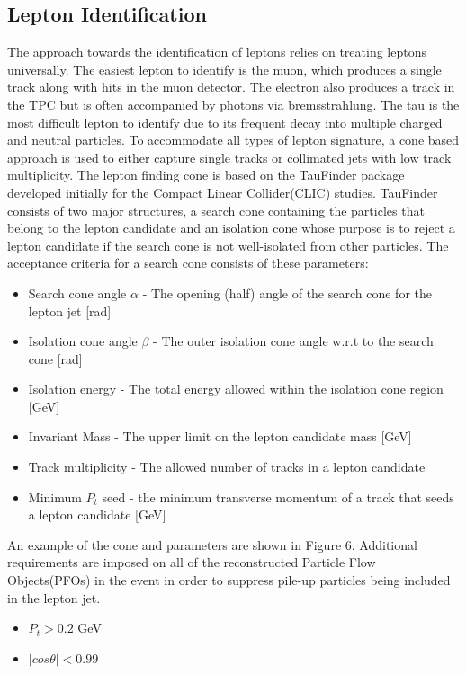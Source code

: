 \subsection{Lepton Identification}
\label{subsec:Lepton_ID}
The approach towards the identification of leptons relies on treating leptons universally. The easiest lepton to identify is the muon, which produces a single track along with hits in the muon detector. The electron also produces a track in the TPC but is often accompanied by photons via bremsstrahlung. The tau is the most difficult lepton to identify due to its frequent decay into multiple charged and neutral particles. To accommodate all types of lepton signature, a cone based approach is used to either capture single tracks or collimated jets with low track multiplicity. The lepton finding cone is based on the TauFinder package \cite{taufinder} developed initially for the Compact Linear Collider(CLIC) studies. TauFinder consists of two major structures, a search cone containing the particles that belong to the lepton candidate and an isolation cone whose purpose is to reject a lepton candidate if the search cone is not well-isolated from other particles. The acceptance criteria for a search cone consists of these parameters:
\begin{itemize}
\item Search cone angle $\alpha$ - The opening (half) angle of the search cone for the lepton jet [rad]
\item Isolation cone angle $\beta$ - The outer isolation cone angle w.r.t to the search cone [rad]
\item Isolation energy - The total energy allowed within the isolation cone region [GeV]
\item Invariant Mass - The upper limit on the lepton candidate mass [GeV]
\item Track multiplicity - The allowed number of tracks in a lepton candidate
\item Minimum $P_t$ seed - the minimum transverse momentum of a track that seeds a lepton candidate [GeV] 
\end{itemize}
An example of the cone and parameters are shown in Figure 6. Additional requirements are imposed on all of the reconstructed Particle Flow Objects(PFOs) in the event in order to suppress pile-up particles being included in the lepton jet.
\begin{itemize}
\item $P_t > 0.2$ GeV
\item $|cos\theta| < 0.99$
\end{itemize}
